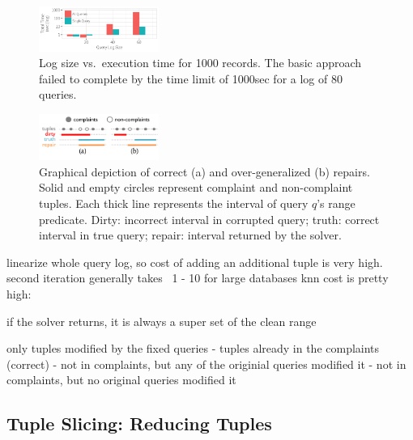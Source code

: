 \begin{figure}[t]
    \centering
    \includegraphics[width=0.35\textwidth]{figures/qsize_time_badscale}
    \vspace*{-0.1in}
    \caption{Log size vs.\ execution time for 1000 records. The basic approach failed to complete by the time limit of 1000sec for a log of $80$ queries.}
    \label{fig:querysize_vs_time}
    \vspace{-2mm}
\end{figure}

\begin{figure}[t]
    \centering
    \includegraphics[width=0.35\textwidth]{figures/2nditerationgroups}
    \vspace*{-2mm}
    \caption{
      Graphical depiction of correct (a) and over-generalized (b) repairs.
      Solid and empty circles represent complaint and non-complaint tuples.
      Each thick line represents the interval of query $q$'s range predicate.
      Dirty: incorrect interval in corrupted query;
      truth: correct interval in true query;
      repair: interval returned by the solver.}
    \label{fig:groups}
    \vspace{-4mm}
\end{figure}



linearize whole query log, so cost of adding an additional tuple is very high.
second iteration generally takes ~1 - 10
for large databases knn cost is pretty high: ~

if the solver returns, it is always a super set of the clean range

only tuples modified by the fixed queries
- tuples already in the complaints (correct)
- not in complaints, but any of the originial queries modified it
- not in complaints, but no original queries modified it
\fi



\subsection{Tuple Slicing: Reducing Tuples}
\label{sec:opt:tbsize}


